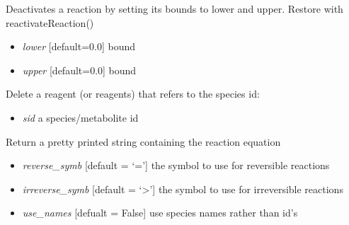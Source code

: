 \documentclass[a4paper,11pt,english]{sphinxmanual}
\begin{document}
\begin{fulllineitems}

\begin{fulllineitems}
\label{modules_doc:cbmpy.CBModel.Reaction.deactivateReaction}
Deactivates a reaction by setting its bounds to lower and upper. Restore with reactivateReaction()
\begin{itemize}
\item {} 
\emph{lower} {[}default=0.0{]} bound

\item {} 
\emph{upper} {[}default=0.0{]} bound

\end{itemize}

\end{fulllineitems}


\begin{fulllineitems}
\label{modules_doc:cbmpy.CBModel.Reaction.deleteReagentWithSpeciesRef}
Delete a reagent (or reagents) that refers to the species id:
\begin{itemize}
\item {} 
\emph{sid} a species/metabolite id

\end{itemize}

\end{fulllineitems}


\begin{fulllineitems}
\label{modules_doc:cbmpy.CBModel.Reaction.getEquation}
Return a pretty printed string containing the reaction equation
\begin{itemize}
\item {} 
\emph{reverse\_symb} {[}default = `='{]} the symbol to use for reversible reactions

\item {} 
\emph{irreverse\_symb} {[}default = `\textgreater{}'{]} the symbol to use for irreversible reactions

\item {} 
\emph{use\_names} {[}defualt = False{]} use species names rather than id's


\end{itemize}
\end{fulllineitems}
\end{fulllineitems}
\end{document}
